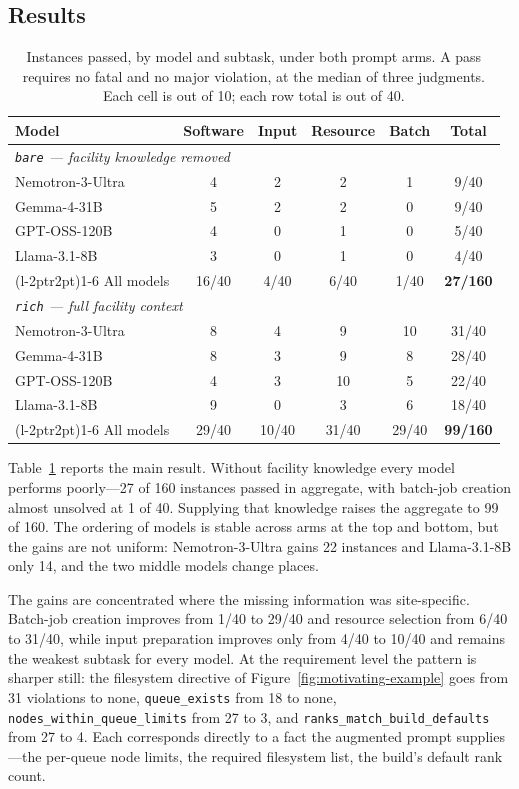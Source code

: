 \documentclass[conference]{IEEEtran}
\begin{document}
\subsection{Results}\label{sec:results}

\begin{table}[t]
\centering
\caption{Instances passed, by model and subtask, under both prompt arms. A pass requires no fatal and no major violation, at the median of three judgments. Each cell is out of 10; each row total is out of 40.}
\label{tab:main-results}
\setlength{\tabcolsep}{4pt}
\begin{tabular}{lcccc@{\hskip 8pt}c}
\toprule
Model & Software & Input & Resource & Batch & Total \\
\midrule
\multicolumn{6}{l}{\emph{\texttt{bare} --- facility knowledge removed}} \\
Nemotron-3-Ultra & 4 & 2 & 2 & 1 & 9/40 \\
Gemma-4-31B      & 5 & 2 & 2 & 0 & 9/40 \\
GPT-OSS-120B     & 4 & 0 & 1 & 0 & 5/40 \\
Llama-3.1-8B     & 3 & 0 & 1 & 0 & 4/40 \\
\cmidrule(l{-2pt}r{2pt}){1-6}
All models & 16/40 & 4/40 & 6/40 & 1/40 & \textbf{27/160} \\
\midrule
\multicolumn{6}{l}{\emph{\texttt{rich} --- full facility context}} \\
Nemotron-3-Ultra & 8 & 4 & 9 & 10 & 31/40 \\
Gemma-4-31B      & 8 & 3 & 9 & 8  & 28/40 \\
GPT-OSS-120B     & 4 & 3 & 10 & 5 & 22/40 \\
Llama-3.1-8B     & 9 & 0 & 3 & 6  & 18/40 \\
\cmidrule(l{-2pt}r{2pt}){1-6}
All models & 29/40 & 10/40 & 31/40 & 29/40 & \textbf{99/160} \\
\bottomrule
\end{tabular}
\end{table}

Table~\ref{tab:main-results} reports the main result. Without facility knowledge every model performs poorly---27 of 160 instances passed in aggregate, with batch-job creation almost unsolved at 1 of 40. Supplying that knowledge raises the aggregate to 99 of 160. The ordering of models is stable across arms at the top and bottom, but the gains are not uniform: Nemotron-3-Ultra gains 22 instances and Llama-3.1-8B only 14, and the two middle models change places.

The gains are concentrated where the missing information was site-specific. Batch-job creation improves from 1/40 to 29/40 and resource selection from 6/40 to 31/40, while input preparation improves only from 4/40 to 10/40 and remains the weakest subtask for every model. At the requirement level the pattern is sharper still: the filesystem directive of Figure~\ref{fig:motivating-example} goes from 31 violations to none, \texttt{queue\_exists} from 18 to none, \texttt{nodes\_within\_queue\_limits} from 27 to 3, and \texttt{ranks\_match\_build\_defaults} from 27 to 4. Each corresponds directly to a fact the augmented prompt supplies---the per-queue node limits, the required filesystem list, the build's default rank count.
\end{document}
